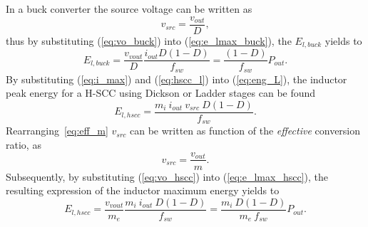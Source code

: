 In a buck converter the source voltage can be written as
\begin{equation}
v_{src}  =  \frac{v_{out}} {D},
\label{eq:vo_buck}
\end{equation}
thus by substituting (\ref{eq:vo_buck}) into (\ref{eq:e_lmax_buck}), the $E_{l,buck}$ yields to
\begin{equation}
E_{l,buck}  =  \frac{v_{vout}}{D} \frac{ i_{out}  D(1-D)}{f_{sw}} = \frac{(1-D)}{f_{sw}} P_{out}.
\label{eq:e_lmax_buck_II}
\end{equation}
By substituting (\ref{eq:i_max}) and (\ref{eq:hscc_l}) into (\ref{eq:eng_L}), the inductor peak energy for a H-SCC using Dickson or Ladder stages can be found
\begin{equation}
E_{l,hscc}  =   \frac{ m_{i} ~ i_{out} ~ v_{src} ~ D(1-D)}{f_{sw}}.
\label{eq:e_lmax_hscc}
\end{equation}
Rearranging~\eqref{eq:eff_m} $v_{src}$ can be written as function of the \emph{effective} conversion ratio, as
\begin{equation}
v_{src}  =  \frac{v_{out}} {m}.
\label{eq:vo_hscc}
\end{equation}
Subsequently, by substituting (\ref{eq:vo_hscc}) into (\ref{eq:e_lmax_hscc}), the resulting expression of the inductor maximum energy yields to
\begin{equation}
E_{l,hscc}  =  \frac{v_{vout}}{m_e} \frac{ m_i ~i_{out} ~ D(1-D)}{f_{sw}} = \frac{m_i~ D (1-D)}{m_e~ f_{sw}} P_{out}.
\label{eq:e_lmax_hscc_II}
\end{equation}

